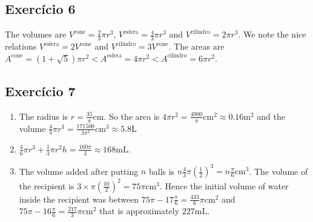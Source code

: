 \subsection*{Exercício 6}

The volumes are $V^{\text{cone}} = \frac{2}{3} \pi r^3$,
$V^{\text{esfera}} = \frac{4}{3} \pi r^3$ and
$V^{\text{cilindro}} = 2 \pi r^3$. We note the nice
relations $V^{\text{esfera}} = 2V^{\text{cone}}$ and
$V^{\text{cilindro}} = 3 V^{\text{cone}}$.
The areas are $A^{\text{cone}} = {(1+\sqrt{5})} \pi r^2 <
A^{\text{esfera}} = 4 \pi r^2 <
A^{\text{cilindro}} = 6 \pi r^2$.

\subsection*{Exercício 7}
\begin{enumerate}
\item The radius is $r=\frac{35}{\pi} \text{cm}$.
  So the area is $4 \pi r^2 = \frac{4900}{\pi} \text{cm}^2
  \approx 0.16 \text{m}^2$
  and the volume $\frac{4}{3} \pi r^3 =
  \frac{171500}{3 \pi^2} \text{cm}^3 \approx 5.8 \text{L}$
\item  ${\frac{4}{6} \pi r^3} + {\frac{1}{3} \pi r^2 h} =
  \frac{160\pi}{3} \approx 168 \text{mL}$.
\item The volume added after putting $n$ balls is
  $n \frac{4}{3} \pi \left(\frac{1}{2}\right)^3 = n \frac{\pi}{6} \text{cm}^3$.
  The volume of the recipient is $3 \times \pi \left(\frac{10}{2}\right)^2 =
  75\pi \text{cm}^3$.
  Hence the initial volume of water inside the recipient was between
  $75\pi - 17\frac{\pi}{6} = \frac{433}{6} \pi \text{cm}^2$ and
  $75\pi - 16\frac{\pi}{6} = \frac{217}{3} \pi \text{cm}^2$ that is
  approximately $227\text{mL}$.
\end{enumerate}
